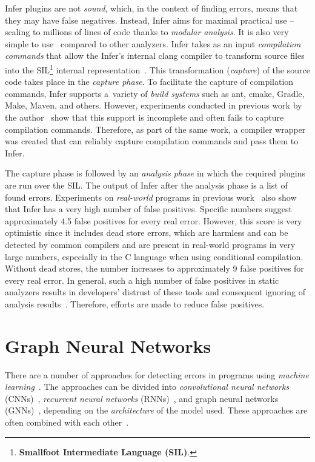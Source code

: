Infer plugins are not \textit{sound}, which, in the context of finding errors, means that they may have false negatives. Instead, Infer aims for maximal practical use -- scaling to millions of lines of code thanks to \textit{modular analysis}. It is also very simple to use~\cite{infer-usage} compared to other analyzers. Infer takes as an input \textit{compilation commands} that allow the Infer's internal clang compiler to transform source files into the SIL\footnote{\textbf{Smallfoot Intermediate Language (SIL)}.} internal representation~\cite{SIL2, SIL}. This transformation (\textit{capture}) of the source code takes place in the \textit{capture phase}. To facilitate the capture of compilation commands, Infer supports a~variety of \textit{build systems} such as ant, cmake, Gradle, Make, Maven, and others. However, experiments conducted in previous work by the author~\cite{bc} show that this support is incomplete and often fails to capture compilation commands. Therefore, as part of the same work, a compiler wrapper was created that can reliably capture compilation commands and pass them to Infer.

The capture phase is followed by an \textit{analysis phase} in which the required plugins are run over the SIL. The output of Infer after the analysis phase is a list of found errors. Experiments on \textit{real-world} programs in previous work~\cite{bc} also show that Infer has a very high number of false positives. Specific numbers suggest approximately 4.5 false positives for every real error. However, this score is very optimistic since it includes dead store errors, which are harmless and can be detected by common compilers and are present in real-world programs in very large numbers, especially in the C language when using conditional compilation. Without dead stores, the number increases to approximately 9 false positives for every real error. In general, such a high number of false positives in static analyzers results in developers' distrust of these tools and consequent ignoring of analysis results~\cite{InferInFB, DisadvantagesOfStaticAnalysis, DisadvantagesOfStaticAnalysis2}. Therefore, efforts are made to reduce false positives.


\section{Graph Neural Networks}
\label{gnn}

There are a number of approaches for detecting errors in programs using \textit{machine learning}~\cite{taxonomy-hanif2021rise}. The approaches can be divided into \textit{convolutional neural networks} (CNNs)~\cite{CNN1-MIX-duan2019vulsniper}, \textit{recurrent neural networks} (RNNs)~\cite{RNN5-li2021vuldeelocator, RNN2-li2021sysevr, RNN3-li2018vuldeepecker, RNN6-lin2017poster, RNN7-saccente2019project, RNN4-zou2019mu}, and graph neural networks (GNNs)~\cite{GNN1-cao2021bgnn4vd, GNN3-cheng2021deepwukong, GNN6-ganz2021explaining, GNN5-vsikic2022graph, GNN4-IBM-suneja2020learning, GNN2-zhou2019devign}, depending on the \textit{architecture} of the model used. These approaches are often combined with each other~\cite{GNN8-RNN-fang2022jstrong, CNN1-RNN-li2020automated, GNN7-RNN-rabheru2020hybrid, RNN1-CNN-russell2018automated}.

